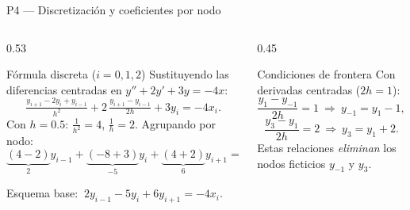 \documentclass[aspectratio=169,10pt]{beamer}
\begin{document}
\begin{frame}{P4 — Discretización y coeficientes por nodo}
\begin{columns}[T]
\begin{column}{0.53\textwidth}
\begin{cardgear}{Fórmula discreta ($i=0,1,2$)}{\faCogs}
{\footnotesize Sustituyendo las diferencias centradas en $y''+2y'+3y=-4x$:
\[
\tfrac{y_{i+1}-2y_i+y_{i-1}}{h^2}+2\,\tfrac{y_{i+1}-y_{i-1}}{2h}+3y_i=-4x_i.
\]
Con $h=0.5$: $\tfrac1{h^2}=4$, $\tfrac1{h}=2$. Agrupando por nodo:
\[
\underbrace{(4-2)}_{2}y_{i-1}+\underbrace{(-8+3)}_{-5}y_i+\underbrace{(4+2)}_{6}y_{i+1}=-4x_i.
\]}
\end{cardgear}
\vspace{1mm}
\begin{cardnota}[\faCheckCircle]
{\footnotesize Esquema base: $\ 2y_{i-1}-5y_i+6y_{i+1}=-4x_i.$}
\end{cardnota}
\end{column}
\begin{column}{0.45\textwidth}
\begin{cardgear}{Condiciones de frontera}{\faTable}
{\footnotesize Con derivadas centradas ($2h=1$):
\[
\frac{y_1-y_{-1}}{2h}=1\ \Rightarrow\ y_{-1}=y_1-1,
\]
\[
\frac{y_3-y_1}{2h}=2\ \Rightarrow\ y_3=y_1+2.
\]
Estas relaciones \emph{eliminan} los nodos ficticios $y_{-1}$ y $y_3$.}
\end{cardgear}
\end{column}
\end{columns}
\end{frame}
\end{document}
